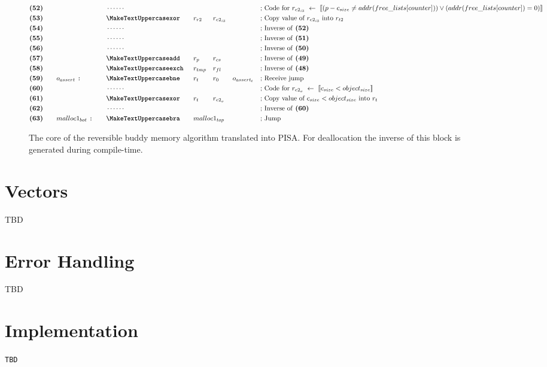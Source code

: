 \begin{figure}[ht]
{\begin{minipage}{\linewidth}
\begin{alignat*}{7}
    &\textbf{(52)}\quad&& &&\cdots\cdots && && && &&\text{; Code for $r_{e2_{i3}}\ \leftarrow\ \llbracket (p - c_{size} \neq addr(free\_lists[counter])) \vee (addr(free\_lists[counter]) = 0) \rrbracket$}\\
    &\textbf{(53)}\quad&& &&\inst{xor} &&r_{r2} && r_{e2_{i3}} && && \text{; Copy value of $r_{e2_{i3}}$ into $r_{t2}$}\\
    &\textbf{(54)}\quad&& &&\cdots\cdots && && && &&\text{; Inverse of \textbf{(52)}}\\
    &\textbf{(55)}\quad&& &&\cdots\cdots && && && &&\text{; Inverse of \textbf{(51)}}\\
    &\textbf{(56)}\quad&& &&\cdots\cdots && && && &&\text{; Inverse of \textbf{(50)}}\\
    &\textbf{(57)}\quad&& &&\inst{add} &&r_{p} && r_{cs} && && \text{; Inverse of \textbf{(49)}}\\
    &\textbf{(58)}\quad&& &&\inst{exch} &&r_{tmp} && r_{fl} && && \text{; Inverse of \textbf{(48)}}\\
    &\textbf{(59)}\quad&&o_{assert}\ \texttt{:}\quad &&\inst{bne} &&r_{t} && r_0 && o_{assert_t} && \text{; Receive jump}\\
    &\textbf{(60)}\quad&& &&\cdots\cdots && && && &&\text{; Code for $r_{e2_o}\ \leftarrow\ \llbracket c_{size} < object_{size} \rrbracket$}\\
    &\textbf{(61)}\quad&& &&\inst{xor}\quad &&r_t && r_{e2_o} && &&\text{; Copy value of $c_{size} < object_{size}$ into $r_t$}\\        
    &\textbf{(62)}\quad&& &&\cdots\cdots && && && &&\text{; Inverse of \textbf{(60)}}\\ 
    &\textbf{(63)}\quad&&malloc1_{bot}\ \texttt{:}\quad  &&\inst{bra}\quad &&malloc1_{top} \span\omit\span\quad \span\omit\span\quad &&\text{; Jump}\\
    \end{alignat*}
    \end{minipage}
    }
    
    \caption{The core of the reversible buddy memory algorithm translated into PISA. For deallocation the inverse of this block is generated during compile-time.}
    \label{fig:malloc1-pisa} 
    \end{figure}

\newpage    

\section{Vectors}
TBD

\section{Error Handling}
TBD

\section{Implementation}



\texttt{TBD} 
